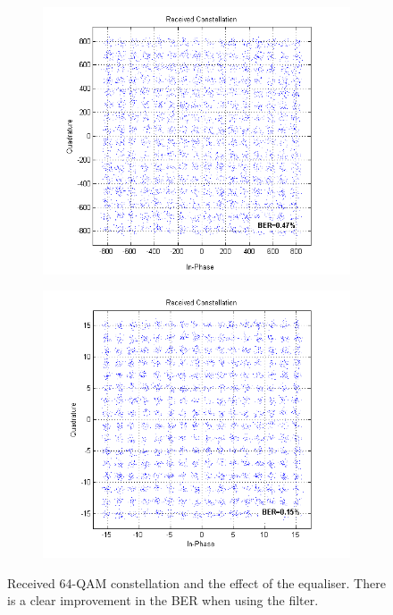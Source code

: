 \documentclass[12pt,a4paper,openright]{report}
\begin{document}
 \begin{figure}[H]
 \centering
 \begin{subfigure}{.4\textwidth}
   \centering
   \includegraphics[width=\textwidth]{rcvdNOEQ.png}
   \label{fig:ConstBeforeFilt}
    \end{subfigure}%
 \begin{subfigure}{.4\textwidth}
   \includegraphics[width=\textwidth]{rcvdEQ.png}
     \label{fig:ConstAfterFilt}
    \end{subfigure}
 \caption[Received 64-QAM constellation and the effect of the equaliser]{Received 64-QAM constellation and the effect of the equaliser. There is a clear improvement in the BER when using the filter.}
    \label{fig:RcvdQAMsignal}
 \end{figure} 
\end{document}
